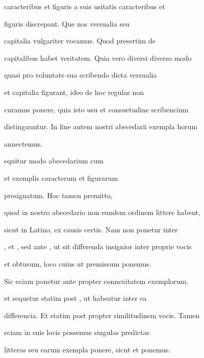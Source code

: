 caracteribus et figuris a suis usitatis caracteribus et

figuris discrepant. Que nos versualia seu

capitalia vulgariter vocamus. Quod presertim de

capitalibus habet veritatem. Quia vero diversi diverso modo

quasi pro voluntate sua scribendo dicta versualia

et capitalia figurant, ideo de hoc regulas non

curamus ponere, quia isto usu et consuetudine scribencium

distinguuntur. In fine autem nostri abecedarii exempla horum

annectemus.

\indentP {}equitur modo abecedarium cum 

 et exemplis caracterum et figurarum

presignatum. Hoc tamen premitto,

quod in nostro abecedario non eundem ordinem littere habent,

sicut in Latino, ex causis certis. Nam  non ponetur inter

, et , sed ante , ut sit differenda insignior inter  proprie vocis

et  obtusum, loco cuius ut premissum  ponemus.

Sic eciam  ponetur ante  propter connexitatem exemplorum,

et  sequetur statim post , ut habeatur inter ea 

 differencia. Et  statim post  propter similitudinem vocis. Tamen

eciam in suis locis possemus singulas predictas

\newpage






\fullpreviouslines


{
\color{blue}

litteras seu earum exempla ponere, sicut et
ponemus.


}




\endinput








